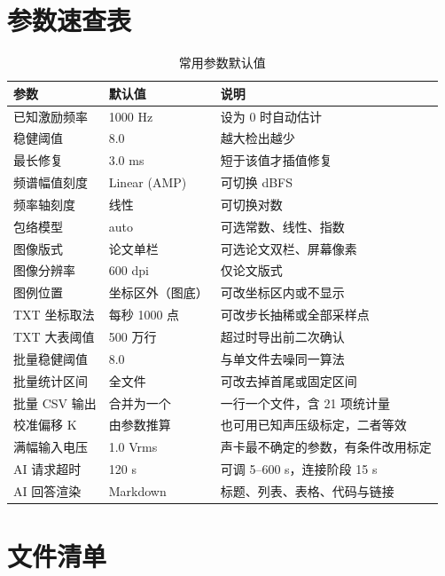 \documentclass[UTF8,a4paper,12pt,scheme=chinese]{ctexart}
\begin{document}
\newpage
\appendix

\section{参数速查表}

\begin{table}[htbp]
\centering
\caption{常用参数默认值}
\begin{tabular}{@{}lll@{}}
\toprule
参数 & 默认值 & 说明 \\
\midrule
已知激励频率 & 1000 Hz & 设为 0 时自动估计 \\
稳健阈值 & 8.0 & 越大检出越少 \\
最长修复 & 3.0 ms & 短于该值才插值修复 \\
频谱幅值刻度 & Linear (AMP) & 可切换 dBFS \\
频率轴刻度 & 线性 & 可切换对数 \\
包络模型 & auto & 可选常数、线性、指数 \\
图像版式 & 论文单栏 & 可选论文双栏、屏幕像素 \\
图像分辨率 & 600 dpi & 仅论文版式 \\
图例位置 & 坐标区外（图底） & 可改坐标区内或不显示 \\
TXT 坐标取法 & 每秒 1000 点 & 可改步长抽稀或全部采样点 \\
TXT 大表阈值 & 500 万行 & 超过时导出前二次确认 \\
批量稳健阈值 & 8.0 & 与单文件去噪同一算法 \\
批量统计区间 & 全文件 & 可改去掉首尾或固定区间 \\
批量 CSV 输出 & 合并为一个 & 一行一个文件，含 21 项统计量 \\
校准偏移 K & 由参数推算 & 也可用已知声压级标定，二者等效 \\
满幅输入电压 & 1.0 Vrms & 声卡最不确定的参数，有条件改用标定 \\
AI 请求超时 & 120 s & 可调 5--600 s，连接阶段 15 s \\
AI 回答渲染 & Markdown & 标题、列表、表格、代码与链接\\
\bottomrule
\end{tabular}
\end{table}

\section{文件清单}
\end{document}
